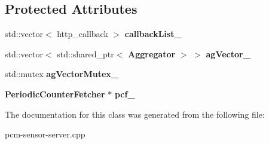 \subsection*{Protected Attributes}
\begin{DoxyCompactItemize}
\item 
\mbox{\label{classHTTPServer_a4bdca9e2d616864b30b5f5f39baada1b}} 
std\+::vector$<$ http\+\_\+callback $>$ {\bfseries callback\+List\+\_\+}
\item 
\mbox{\label{classHTTPServer_af9f43f3a70dfed348a1d4120fe6da16e}} 
std\+::vector$<$ std\+::shared\+\_\+ptr$<$ \textbf{ Aggregator} $>$ $>$ {\bfseries ag\+Vector\+\_\+}
\item 
\mbox{\label{classHTTPServer_ab8b358aebb638d88e2080158a5aad914}} 
std\+::mutex {\bfseries ag\+Vector\+Mutex\+\_\+}
\item 
\mbox{\label{classHTTPServer_a417da5be7b14ecfeb214ea1cbd3eae20}} 
\textbf{ Periodic\+Counter\+Fetcher} $\ast$ {\bfseries pcf\+\_\+}
\end{DoxyCompactItemize}


The documentation for this class was generated from the following file\+:\begin{DoxyCompactItemize}
\item 
pcm-\/sensor-\/server.\+cpp\end{DoxyCompactItemize}
